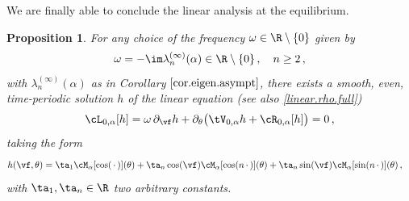 \documentclass[a4paper,reqno,10pt]{article}
\newtheorem{pro}{Proposition}[section]
\newcommand{\pa}{\partial}
\begin{document}
We are finally able to conclude the linear analysis at the equilibrium.
\begin{pro}
    For any choice of the frequency $\omega\in\R\setminus\{0\}$ given by
    \begin{equation}
        \omega = -\im \lambda_{n}^{(\infty)}(\alpha) \in \R \setminus\{0\}\,, \quad n \geq 2\,,
    \end{equation}
    with $\lambda_{n}^{(\infty)}(\alpha)$ as in  Corollary $\ref{cor.eigen.asympt}$, there exists a smooth, even, time-periodic solution $h$ of the linear equation (see also \eqref{linear.rho.full})
    \begin{equation}
        \cL_{0,\alpha}[h] = \omega\,\pa_{\vf}h + \pa_{\theta} \big(\tV_{0,\alpha}h + \cR_{0,\alpha}[h] \big) = 0 \,,
    \end{equation}
    taking the form
    \begin{equation}
	\begin{aligned}
		h(\vf,\theta) 
		& =\ta_{1}\cM_{\alpha}[\cos(\,\cdot\,)](\theta) +  \ta_{n}\cos(\vf) \cM_{\alpha}[\cos(n\,\cdot\,)](\theta)+ \ta_{n}\sin(\vf) \cM_{\alpha}[\sin(n\,\cdot\,)](\theta) \,,
	\end{aligned}
\end{equation}
with $\ta_{1},\ta_{n}\in\R$ two arbitrary constants.
\end{pro}
\end{document}
